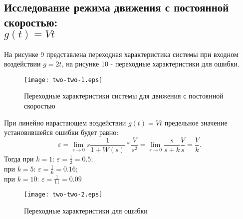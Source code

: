 \documentclass[a4paper,12pt]{article} %
\begin{document}
\subsection{Исследование режима движения с постоянной скоростью: \\$g(t)=Vt$} 
На рисунке 9 представлена переходная характеристика системы при входном воздействии $g=2t$, на рисунке 10  - переходные характеристики для ошибки.
\begin{figure}[H]
	\centering
	\texttt{[image: two-two-1.eps]}
	\caption{Переходные характеристики системы для движения с постоянной скоростью}
\end{figure}
При линейно нарастающем воздействии $g(t)=Vt$ предельное значение установившейся ошибки будет равно:
\begin{equation}
    \varepsilon = \lim_{s\to 0}s\frac{1}{1+W(s)}*\frac{V}{s^2} = \lim_{s\to 0}\frac{s}{s+k}\frac{V}{s} = \frac{V}{k}.
\end{equation}
Тогда при $k=1$: $\varepsilon = \displaystyle{\frac{1}{2} = 0.5;}$\\
при $k=5$: $\varepsilon = \displaystyle{\frac{1}{6} = 0.16;}$\\
при $k=10$: $\varepsilon = \displaystyle{\frac{1}{11} = 0.09}$
\begin{figure}[H]
	\centering
	\texttt{[image: two-two-2.eps]}
	\caption{Переходные характеристики для ошибки}
\end{figure}
\end{document}
